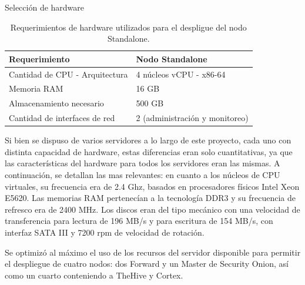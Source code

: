 \begin{section}{Selección de hardware}
\begin{table}[H]
\begin{tabular}{|m{10em}|m{10em}|}
            \hline 
                Requerimiento  & Nodo Standalone \\ 
            \hline
                Cantidad de CPU - Arquitectura &  4 núcleos vCPU - x86-64  \\ 
            \hline
                Memoria RAM  &  16 GB  \\ 
            \hline
                Almacenamiento necesario   & 500 GB  \\
            \hline
        Cantidad de interfaces de red  & 2 (administración y monitoreo) \\
            \hline %
        \end{tabular}
        \caption{Requerimientos de hardware utilizados para el despligue del nodo Standalone.}
        \label{table:16}
        \end{table}
        \FloatBarrier 
        Si bien se dispuso de varios servidores a lo largo de este proyecto, cada uno con distinta capacidad de hardware, estas diferencias eran solo cuantitativas, ya que las características del hardware para todos los servidores eran las mismas. A continuación, se detallan las mas relevantes:
        en cuanto a los núcleos de CPU virtuales, su frecuencia era de 2.4 Ghz, basados en procesadores físicos Intel Xeon E5620. Las memorias RAM pertenecían a la tecnología DDR3 y su frecuencia de refresco era de 2400 MHz.
        Los discos eran del tipo mecánico con una velocidad de transferencia para lectura de 196 MB/s y para escritura de 154 MB/s, con interfaz SATA III y 7200 rpm de velocidad de rotación. \par
    	Se optimizó al máximo el uso de los recursos del servidor disponible para permitir el despliegue de cuatro nodos: dos Forward y un Master de Security Onion, así como un cuarto conteniendo a TheHive y Cortex. \par


\end{section}
